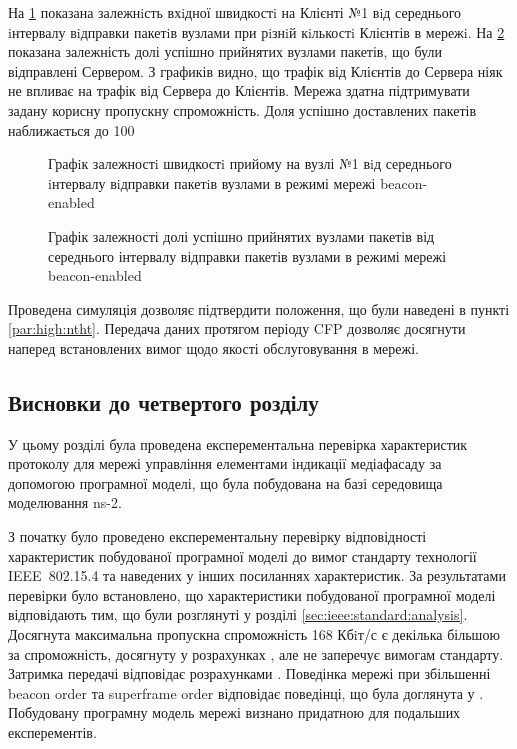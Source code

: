 \documentclass[a4paper,ukrainian,utf8,nocolumnsxix,floatsection,equationsection]{eskdtext}
\newcommand{\longcaption}[1]{\captionsetup{style=figureLongCaption}\caption{#1}}
\newcommand{\iee}[0]{IEEE~802.15.4\xspace}
\newcommand{\bem}[0]{beacon-enabled\xspace}
\begin{document}
На \cref{fig:result_test_backtraf_beac_brd_tp1} показана залежнiсть вхiдної швидкостi на Клієнті №1 вiд середнього iнтервалу вiдправки пакетiв вузлами при рiзнiй кiлькостi Клієнтів в мережi. На \cref{fig:result_test_backtraf_beac_brd_deliv} показана залежність долі успішно прийнятих вузлами пакетів, що були відправлені Сервером. З графиків видно, що трафік від Клієнтів до Сервера ніяк не впливає на трафік від Сервера до Клієнтів. Мережа здатна підтримувати задану корисну пропускну спроможність. Доля успішно доставлених пакетів наближається до 100%

\begin{figure}[bp]
	\centering
	\longcaption{\label{fig:result_test_backtraf_beac_brd_tp1}Графiк залежностi швидкостi прийому на вузлі №1 вiд середнього iнтервалу вiдправки пакетiв вузлами в режимі мережі \bem}
\end{figure}

\begin{figure}[htbp]
	\centering
	\longcaption{\label{fig:result_test_backtraf_beac_brd_deliv}Графік залежності долі успішно прийнятих вузлами пакетів від середнього інтервалу відправки пакетів вузлами в режимі мережі \bem}
\end{figure}


Проведена симуляція дозволяє підтвердити положення, що були наведені в пункті \ref{par:high:ntht}. Передача даних протягом періоду CFP дозволяє досягнути наперед встановлених вимог щодо якості обслуговування в мережі. 

\subsection{Висновки до  четвертого розділу}

У цьому розділі була проведена експерементальна перевірка характеристик протоколу для мережі управління елементами індикації медіафасаду за допомогою програмної моделі, що була побудована на базі середовища моделювання ns-2.

З початку було проведено експерементальну перевірку відповідності характеристик побудованої програмної моделі до вимог стандарту технології \iee та наведених у інших посиланнях характеристик. За результатами перевірки було встановлено, що характеристики побудованої програмної моделі відповідають тим, що були розглянуті у розділі \ref{sec:ieee:standard:analysis}. Досягнута максимальна пропускна спроможність  168 Кбiт/с є декілька більшою за спроможність, досягнуту у розрахунках \cite{thoroughput:analysis:unslotted:ieee}, але не заперечує вимогам стандарту. Затримка передачі відповідає розрахунками \cite{thoroughput:analysis:unslotted:ieee}. Поведінка мережі при збільшенні beacon order та superframe order відповідає поведінці, що була доглянута у \cite{simulation:study:slotted:ieee}. Побудовану програмну модель мережі визнано придатною для подальших експерементів.
\end{document}
